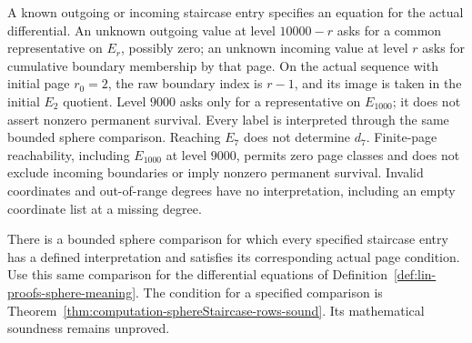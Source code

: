 \begin{definition}
  \label{def:lin-staircase-states}
  A known outgoing or incoming staircase entry specifies an equation
  for the actual differential. An unknown outgoing value at level
  $10000-r$ asks for a common representative on $E_r$, possibly zero;
  an unknown incoming value at level $r$ asks for cumulative boundary
  membership by that page. On the actual sequence with initial page
  $r_0=2$, the raw boundary index is $r-1$, and its image is taken in
  the initial $E_2$ quotient. Level $9000$ asks only for a representative
  on $E_{1000}$; it does not assert nonzero permanent survival.
  Every label is interpreted through the same bounded sphere
  comparison. Reaching $E_7$ does not determine $d_7$. Finite-page
  reachability, including $E_{1000}$ at level $9000$, permits zero page
  classes and does not exclude incoming boundaries or imply nonzero
  permanent survival. Invalid coordinates and out-of-range degrees have no
  interpretation, including an empty coordinate list at a missing degree.
\end{definition}

\begin{theorem}
  \label{thm:lin-staircase-delivery}
  \notready
  There is a bounded sphere comparison for which every specified
  staircase entry has a defined interpretation and
  satisfies its corresponding actual page condition. Use this same
  comparison for the differential equations of
  Definition~\ref{def:lin-proofs-sphere-meaning}.
  The condition for a specified comparison is
  Theorem~\ref{thm:computation-sphereStaircase-rows-sound}.
  Its mathematical soundness remains unproved.
\end{theorem}

